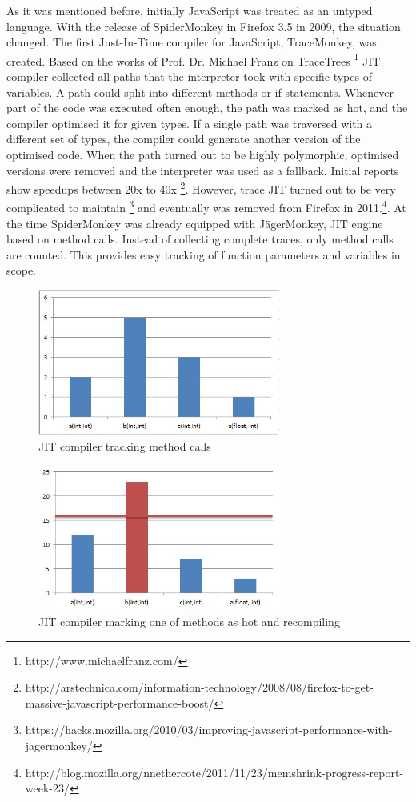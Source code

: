 As it was mentioned before, initially JavaScript was treated as an untyped language. With the release of SpiderMonkey in Firefox 3.5 in 2009, the situation changed. The first Just-In-Time compiler for JavaScript, TraceMonkey, was created. Based on the works of Prof. Dr. Michael Franz on TraceTrees \footnote{http://www.michaelfranz.com/} JIT compiler collected all paths that the interpreter took with specific types of variables. A path could split into different methods or if statements. Whenever part of the code was executed often enough, the path was marked as hot, and the compiler optimised it for given types. If a single path was traversed with a different set of types, the compiler could generate another version of the optimised code. When the path turned out to be highly polymorphic, optimised versions were removed and the interpreter was used as a fallback.
Initial reports show speedups between 20x to 40x \footnote{http://arstechnica.com/information-technology/2008/08/firefox-to-get-massive-javascript-performance-boost/}.
However, trace JIT turned out to be very complicated to maintain \footnote{https://hacks.mozilla.org/2010/03/improving-javascript-performance-with-jagermonkey/} and eventually was removed from Firefox in 2011.\footnote{http://blog.mozilla.org/nnethercote/2011/11/23/memshrink-progress-report-week-23/}. At the time SpiderMonkey was already equipped with JägerMonkey, JIT engine based on method calls. Instead of collecting complete traces, only method calls are counted. This provides easy tracking of function parameters and variables in scope.

\begin{figure}[h!]
  \caption{JIT compiler tracking method calls}
  \label{img:jit-1}
  \centering
	\includegraphics[width=8cm]{jit-1}
\end{figure}


\begin{figure}[h!]
  \caption{JIT compiler marking one of methods as hot and recompiling}
  \label{img:jit-2}
  \centering
	\includegraphics[width=8cm]{jit-2}
\end{figure}


